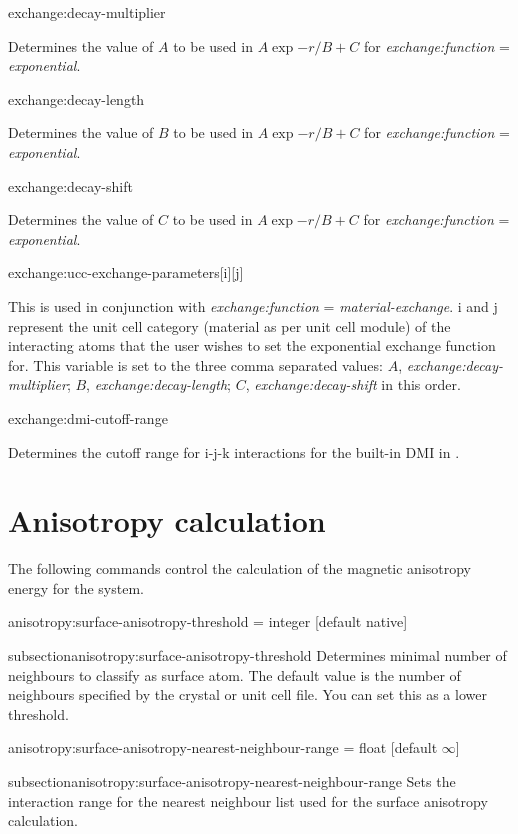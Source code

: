{\zicf exchange:decay-multiplier} Determines the value of $A$ to be used in $A\exp{-r/B}+C$ for \textit{exchange:function} = \textit{exponential}.

{\zicf exchange:decay-length} Determines the value of $B$ to be used in $A\exp{-r/B}+C$ for \textit{exchange:function} = \textit{exponential}.

{\zicf exchange:decay-shift} Determines the value of $C$ to be used in $A\exp{-r/B}+C$ for \textit{exchange:function} = \textit{exponential}.

{\zicf exchange:ucc-exchange-parameters[i][j]} This is used in conjunction with \textit{exchange:function} = \textit{material-exchange}. i and j represent the unit cell category (material as per unit cell module) of the interacting atoms that the user wishes to set the exponential exchange function for. This variable is set to the three comma separated values: $A$, \textit{exchange:decay-multiplier}; $B$, \textit{exchange:decay-length}; $C$, \textit{exchange:decay-shift} in this order.

{\zicf exchange:dmi-cutoff-range} Determines the cutoff range for i-j-k interactions for the built-in DMI in \vampire.

\section*{Anisotropy calculation}
 The following commands control the calculation of the magnetic anisotropy energy for the system.

{\zicf anisotropy:surface-anisotropy-threshold = integer [default native]}
{subsection}{anisotropy:surface-anisotropy-threshold} Determines minimal number of neighbours to classify as surface atom. The default value is the number of neighbours specified by the crystal or unit cell file. You can set this as a lower threshold.

{\zicf anisotropy:surface-anisotropy-nearest-neighbour-range = float [default $\infty$]}
{subsection}{anisotropy:surface-anisotropy-nearest-neighbour-range} Sets the interaction range for the nearest neighbour list used for the surface anisotropy calculation.

